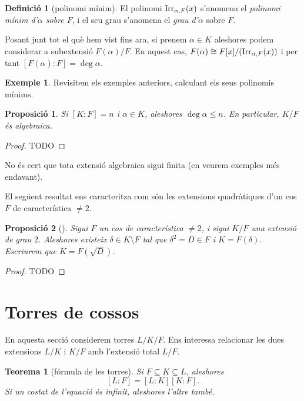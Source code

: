 \documentclass[
]{book}
\newtheorem{theorem}{Teorema}[chapter]
\newtheorem{proposition}{Proposició}[chapter]
\theoremstyle{definition}
\newtheorem{definition}{Definició}[chapter]
\theoremstyle{definition}
\newtheorem{example}{Exemple}[chapter]
\theoremstyle{definition}
\theoremstyle{definition}
\theoremstyle{remark}
\begin{document}
\begin{definition}[polinomi mínim]
El polinomi \(\operatorname{Irr}_{\alpha,F}(x)\) s'anomena el \emph{polinomi mínim d'\(\alpha\) sobre \(F\)}, i el seu grau s'anomena el \emph{grau d'\(\alpha\)}
sobre \(F\).
\end{definition}

Posant junt tot el què hem vist fins ara, si prenem \(\alpha\in K\) aleshores podem considerar a subextensió \(F(\alpha)/F\).
En aquest cas, \(F(\alpha)\cong F[x]/(\operatorname{Irr}_{\alpha,F}(x))\) i per tant \([F(\alpha)\colon F] = \deg \alpha\).

\begin{example}
Revisitem els exemples anteriors, calculant els seus polinomis mínims.
\end{example}

\begin{proposition}
Si \([K\colon F]=n\) i \(\alpha\in K\), aleshores \(\deg\alpha\leq n\). En particular, \(K/F\) és algebraica.
\end{proposition}

\begin{proof}
TODO
\end{proof}

No és cert que tota extensió algebraica sigui finita (en veurem exemples més endavant).

El següent resultat ens caracteritza com són les extensions quadràtiques d'un cos \(F\) de característica \(\neq 2\).

\begin{proposition}[]
Sigui \(F\) un cos de característica \(\neq 2\), i sigui \(K/F\) una extensió de grau \(2\). Aleshores existeix \(\delta\in K\setminus F\)
tal que \(\delta^2=D\in F\) i \(K=F(\delta)\). Escriurem que \(K=F(\sqrt{D})\).
\end{proposition}

\begin{proof}
TODO
\end{proof}

\hypertarget{torres-de-cossos}{%
\section{Torres de cossos}\label{torres-de-cossos}}

En aquesta secció considerem torres \(L/K/F\). Ens interessa relacionar les dues extensions \(L/K\) i \(K/F\) amb l'extensió
total \(L/F\).

\begin{theorem}[fórmula de les torres]
\protect\hypertarget{thm:torres}{}\label{thm:torres}Si \(F\subseteq K\subseteq L\), aleshores
\[
[L\colon F] = [L\colon K][K \colon F].
\]
Si un costat de l'equació és infinit, aleshores l'altre també.
\end{theorem}
\end{document}
